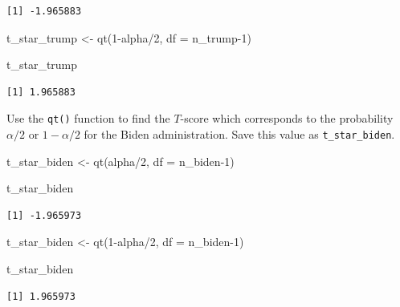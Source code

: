 \documentclass[
  letterpaper,
  DIV=11,
  numbers=noendperiod]{scrartcl}
\newenvironment{Shaded}{\begin{snugshade}}{\end{snugshade}}
\newcommand{\AttributeTok}[1]{\textcolor[rgb]{0.40,0.45,0.13}{#1}}
\newcommand{\DecValTok}[1]{\textcolor[rgb]{0.68,0.00,0.00}{#1}}
\newcommand{\FunctionTok}[1]{\textcolor[rgb]{0.28,0.35,0.67}{#1}}
\newcommand{\NormalTok}[1]{\textcolor[rgb]{0.00,0.23,0.31}{#1}}
\newcommand{\OtherTok}[1]{\textcolor[rgb]{0.00,0.23,0.31}{#1}}
\newcommand{\SpecialCharTok}[1]{\textcolor[rgb]{0.37,0.37,0.37}{#1}}
\begin{document}
\begin{verbatim}
[1] -1.965883
\end{verbatim}

\begin{Shaded}
\begin{Highlighting}[]
\NormalTok{t\_star\_trump }\OtherTok{\textless{}{-}} \FunctionTok{qt}\NormalTok{(}\DecValTok{1}\SpecialCharTok{{-}}\NormalTok{alpha}\SpecialCharTok{/}\DecValTok{2}\NormalTok{, }
                   \AttributeTok{df =}\NormalTok{ n\_trump}\DecValTok{{-}1}\NormalTok{)}

\NormalTok{t\_star\_trump}
\end{Highlighting}
\end{Shaded}

\begin{verbatim}
[1] 1.965883
\end{verbatim}

Use the \texttt{qt()} function to find the \(T\)-score which corresponds
to the probability \(\alpha/2\) or \(1-\alpha/2\) for the Biden
administration. Save this value as \texttt{t\_star\_biden}.

\begin{Shaded}
\begin{Highlighting}[]
\NormalTok{t\_star\_biden }\OtherTok{\textless{}{-}} \FunctionTok{qt}\NormalTok{(alpha}\SpecialCharTok{/}\DecValTok{2}\NormalTok{, }
                   \AttributeTok{df =}\NormalTok{ n\_biden}\DecValTok{{-}1}\NormalTok{)}

\NormalTok{t\_star\_biden}
\end{Highlighting}
\end{Shaded}

\begin{verbatim}
[1] -1.965973
\end{verbatim}

\begin{Shaded}
\begin{Highlighting}[]
\NormalTok{t\_star\_biden }\OtherTok{\textless{}{-}} \FunctionTok{qt}\NormalTok{(}\DecValTok{1}\SpecialCharTok{{-}}\NormalTok{alpha}\SpecialCharTok{/}\DecValTok{2}\NormalTok{, }
                   \AttributeTok{df =}\NormalTok{ n\_biden}\DecValTok{{-}1}\NormalTok{)}

\NormalTok{t\_star\_biden}
\end{Highlighting}
\end{Shaded}

\begin{verbatim}
[1] 1.965973
\end{verbatim}
\end{document}
